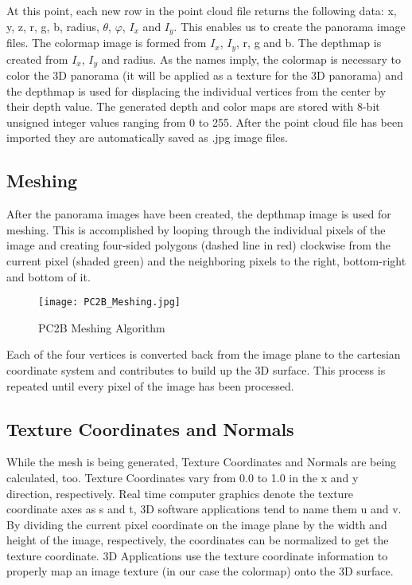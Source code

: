 At this point, each new row in the point cloud file returns the following data: x, y, z, r, g, b, radius, $\theta$, $\varphi$,  $I_x$ and  $I_y$. This enables us to create the panorama image files. The colormap image is formed from $I_x$, $I_y$, r, g and b. The depthmap is created from $I_x$, $I_y$ and radius. As the names imply, the colormap is necessary to color the 3D panorama (it will be applied as a texture for the 3D panorama) and the depthmap is used for displacing the individual vertices from the center by their depth value. The generated depth and color maps are stored with 8-bit unsigned integer values ranging from 0 to 255. After the point cloud file has been imported they are automatically saved as .jpg image files.

\subsection{Meshing}

After the panorama images have been created, the depthmap image is used for meshing. This is accomplished by looping through the individual pixels of the image and creating four-sided polygons (dashed line in red) clockwise from the current pixel (shaded green) and the neighboring pixels to the right, bottom-right and bottom of it.

\begin{figure}[h]
	\centering
	\texttt{[image: PC2B\_Meshing.jpg]}
	\caption{PC2B Meshing Algorithm}
	\label{fig:pc2b_meshing}
\end{figure}

Each of the four vertices is converted back from the image plane to the cartesian coordinate system and contributes to build up the 3D surface. This process is repeated until every pixel of the image has been processed.

\subsection{Texture Coordinates and Normals}  \label{section_texture_coordinates_and_normals}

While the mesh is being generated, Texture Coordinates and Normals are being calculated, too. Texture Coordinates vary from 0.0 to 1.0 in the x and y direction, respectively. Real time computer graphics denote the texture coordinate axes as s and t, 3D software applications tend to name them u and v. By dividing the current pixel coordinate on the image plane by the width and height of the image, respectively, the coordinates can be normalized to get the texture coordinate. 3D Applications use the texture coordinate information to properly map an image texture (in our case the colormap) onto the 3D surface.


